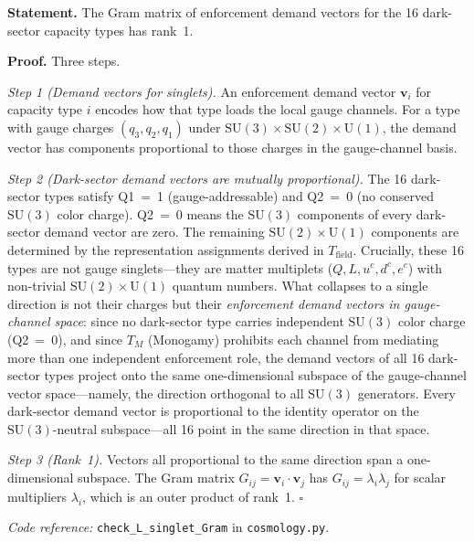 \documentclass[11pt]{article}
\newcommand{\coderef}[2]{\smallskip\noindent\textit{Code reference:} \texttt{#1} in \texttt{#2}.}
\newcommand{\SU}{\mathrm{SU}}
\newcommand{\U}{\mathrm{U}}
\begin{document}
\begin{tcolorbox}[apfbox, title={Lemma $L_{\mathrm{singlet,Gram}}$ (Rank-1 Dark Sector)}]
\textbf{Statement.}  The Gram matrix of enforcement demand vectors for the 16 dark-sector capacity types has rank~1.

\smallskip\noindent\textbf{Proof.}  Three steps.

\textit{Step 1 (Demand vectors for singlets).}  An enforcement demand vector $\mathbf{v}_i$ for capacity type $i$ encodes how that type loads the local gauge channels.  For a type with gauge charges $(q_3, q_2, q_1)$ under $\SU(3) \times \SU(2) \times \U(1)$, the demand vector has components proportional to those charges in the gauge-channel basis.

\textit{Step 2 (Dark-sector demand vectors are mutually proportional).}  The 16 dark-sector types satisfy Q1~=~1 (gauge-addressable) and Q2~=~0 (no conserved $\SU(3)$ color charge).  Q2~=~0 means the $\SU(3)$ components of every dark-sector demand vector are zero.  The remaining $\SU(2) \times \U(1)$ components are determined by the representation assignments derived in $T_{\mathrm{field}}$.  Crucially, these 16 types are not gauge singlets---they are matter multiplets ($Q, L, u^c, d^c, e^c$) with non-trivial $\SU(2) \times \U(1)$ quantum numbers.  What collapses to a single direction is not their charges but their \emph{enforcement demand vectors in gauge-channel space}: since no dark-sector type carries independent $\SU(3)$ color charge (Q2~=~0), and since $T_M$ (Monogamy) prohibits each channel from mediating more than one independent enforcement role, the demand vectors of all 16 dark-sector types project onto the same one-dimensional subspace of the gauge-channel vector space---namely, the direction orthogonal to all $\SU(3)$ generators.  Every dark-sector demand vector is proportional to the identity operator on the $\SU(3)$-neutral subspace---all 16 point in the same direction in that space.

\textit{Step 3 (Rank~1).}  Vectors all proportional to the same direction span a one-dimensional subspace.  The Gram matrix $G_{ij} = \mathbf{v}_i \cdot \mathbf{v}_j$ has $G_{ij} = \lambda_i \lambda_j$ for scalar multipliers $\lambda_i$, which is an outer product of rank~1.  $\square$

\coderef{check\_L\_singlet\_Gram}{cosmology.py}
\end{tcolorbox}
\end{document}
